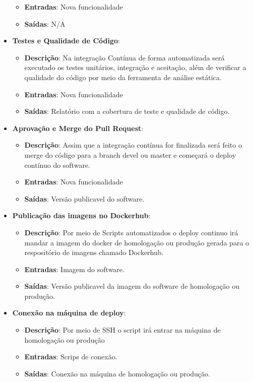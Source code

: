 \begin{itemize}
\begin{itemize}
    \item \textbf{Entradas}: Nova funcionalidade
    \item \textbf{Saídas}: N/A
  \end{itemize}
  \item \textbf{Testes e Qualidade de Código}:
  \begin{itemize}
    \item \textbf{Descrição}: Na integração Contínua de forma automatizada será executado os testes unitários, integração
    e aceitação, além de verificar a qualidade do código por meio da ferramenta de análise estática.
    \item \textbf{Entradas}: Nova funcionalidade
    \item \textbf{Saídas}: Relatório com a cobertura de teste e qualidade de código.
  \end{itemize}
  \item \textbf{Aprovação e Merge do Pull Request}:
  \begin{itemize}
    \item \textbf{Descrição}: Assim que a integração contínua for finalizada será feito o merge do código para a branch
    devel ou master e começará o deploy contínuo do software.
    \item \textbf{Entradas}: Nova funcionalidade
    \item \textbf{Saídas}: Versão publicavel do software.
  \end{itemize}
  \item \textbf{Publicação das imagens no Dockerhub}:
  \begin{itemize}
    \item \textbf{Descrição}: Por meio de Scripts automatizados o deploy continuo irá mandar a imagem do docker de
    homologação ou produção gerada para o respositório de imagens chamado Dockerhub.
    \item \textbf{Entradas}: Imagem do software.
    \item \textbf{Saídas}: Versão publicavel da imagem do software de homologação ou produção.
  \end{itemize}
  \item \textbf{Conexão na máquina de deploy}:
  \begin{itemize}
    \item \textbf{Descrição}: Por meio de SSH o script irá entrar na máquina de homologação ou produção
    \item \textbf{Entradas}: Scrips de conexão.
    \item \textbf{Saídas}: Conexão na máquina de homologação ou produção.

\end{itemize}
\end{itemize}
